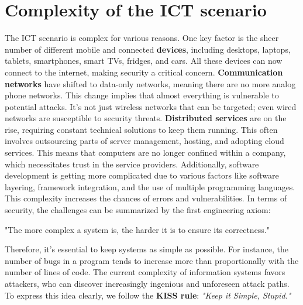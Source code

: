 \section{Complexity of the ICT scenario}
The ICT scenario is complex for various reasons. One key factor is the sheer number of different mobile and connected \textbf{devices}, including desktops, laptops, tablets, smartphones, smart TVs, fridges, and cars. All these devices can now connect to the internet, making security a critical concern.
\textbf{Communication networks } have shifted to data-only networks, meaning there are no more analog phone networks. This change implies that almost everything is vulnerable to potential attacks. It's not just wireless networks that can be targeted; even wired networks are susceptible to security threats.
\textbf{Distributed services} are on the rise, requiring constant technical solutions to keep them running. This often involves outsourcing parts of server management, hosting, and adopting cloud services. This means that computers are no longer confined within a company, which necessitates trust in the service providers. Additionally, software development is getting more complicated due to various factors like software layering, framework integration, and the use of multiple programming languages. This complexity increases the chances of errors and vulnerabilities.
In terms of security, the challenges can be summarized by the first engineering axiom:
\begin{center}
    "The more complex a system is, the harder it is to ensure its correctness."    
\end{center}
Therefore, it's essential to keep systems as simple as possible. For instance, the number of bugs in a program tends to increase more than proportionally with the number of lines of code. The current complexity of information systems favors attackers, who can discover increasingly ingenious and unforeseen attack paths.\\ 
To express this idea clearly, we follow the \textbf{KISS rule}: \emph{"Keep it Simple, Stupid."}




